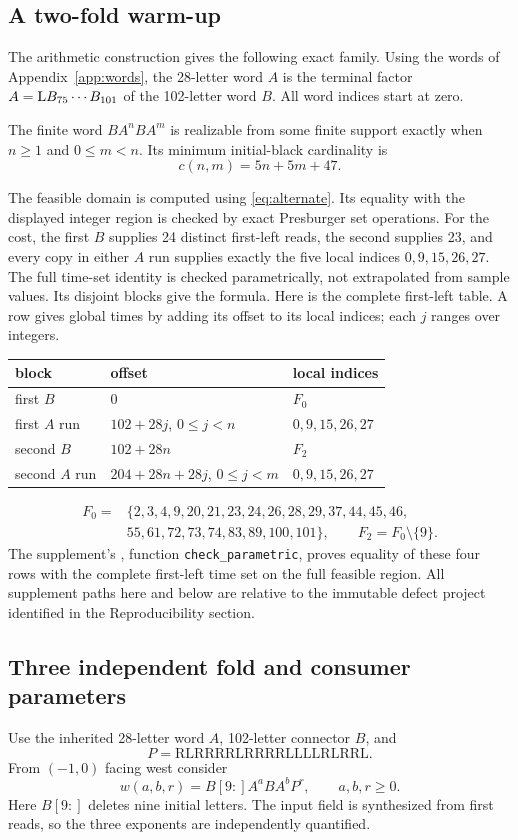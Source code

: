 \subsection{A two-fold warm-up}
The arithmetic construction gives the following exact family. Using the
words of Appendix~\ref{app:words}, the 28-letter word $A$ is the terminal
factor $A=\mathrm L B_{75}\cdots B_{101}$ of the 102-letter word $B$. All word indices start at zero.
\begin{proposition}\label{prop:two}
The finite word $BA^nBA^m$ is realizable from some finite support exactly when
$n\ge1$ and $0\le m<n$. Its minimum initial-black cardinality is
\[
 c(n,m)=5n+5m+47.
\]
\end{proposition}
The feasible domain is computed using \eqref{eq:alternate}. Its equality with
the displayed integer region is checked by exact Presburger set operations.
For the cost, the first $B$ supplies 24 distinct first-left reads, the second
supplies 23, and every copy in either $A$ run supplies exactly the five local
indices $0,9,15,26,27$. The full time-set identity is checked parametrically,
not extrapolated from sample values. Its disjoint blocks give the formula.
Here is the complete first-left table. A row gives global times by adding
its offset to its local indices; each $j$ ranges over integers.
\begin{center}\small
\begin{tabular}{lll}
block & offset & local indices \\\hline
first $B$ & $0$ & $F_0$ \\
first $A$ run & $102+28j$, $0\le j<n$ & $0,9,15,26,27$ \\
second $B$ & $102+28n$ & $F_2$ \\
second $A$ run & $204+28n+28j$, $0\le j<m$ & $0,9,15,26,27$
\end{tabular}
\end{center}
\begin{align*}
F_0={}&\{2,3,4,9,20,21,23,24,26,28,29,37,44,45,46,\\
&55,61,72,73,74,83,89,100,101\},\qquad F_2=F_0\setminus\{9\}.
\end{align*}
The supplement's
, function
\texttt{check\_parametric}, proves equality of these four rows with the
complete first-left time set on the full feasible region. All supplement
paths here and below are relative to the immutable defect project identified
in the Reproducibility section.

\subsection{Three independent fold and consumer parameters}
Use the inherited 28-letter word $A$, 102-letter connector $B$, and
\[P=\mathrm{RLRRRRLRRRRLLLLRLRRL}.\]
From $(-1,0)$ facing west consider
\[
 w(a,b,r)=B[9:]A^aBA^bP^r,\qquad a,b,r\ge0.
\]
Here $B[9:]$ deletes nine initial letters. The input field is synthesized
from first reads, so the three exponents are independently quantified.

